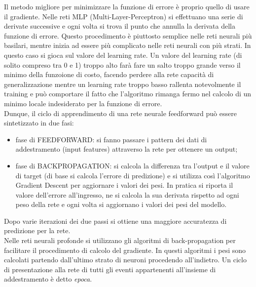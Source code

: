  Il metodo migliore per minimizzare la funzione di errore è proprio quello di usare il gradiente.
 Nelle reti MLP (Multi-Layer-Perceptron) si effettuano una serie di derivate successive e
  ogni volta si trova il punto che annulla la derivata della funzione di errore. Questo procedimento è 
  piuttosto semplice nelle reti neurali più basilari, mentre inizia ad essere più complicato
   nelle reti neurali con più strati. In questo caso si gioca sul valore del learning rate.
   Un valore del learning rate (di solito compreso tra 0 e 1) troppo alto farà fare un
    salto troppo grande verso il minimo della funzoione di costo, 
   facendo perdere alla rete capacità di generalizzazione mentre un learning rate troppo basso rallenta
    notevolmente il training e può comportare il fatto che l'algoritmo rimanga fermo nel 
    calcolo di un minimo locale indesiderato per la funzione di errore. \\
   

Dunque, il ciclo di apprendimento di una rete neurale feedforward può essere sintetizzato in due fasi:
\begin{itemize}
\item fase di FEEDFORWARD: si fanno passare i pattern dei dati di addestramento (input features) 
attraverso la rete per ottenere un output;\\
\item fase di BACKPROPAGATION: si calcola la differenza tra l'output e il valore di
  target (di base si calcola l’errore di predizione) e si utilizza così l’algoritmo Gradient Descent 
  per aggiornare i valori dei pesi. In pratica si riporta il valore dell’errore all’ingresso, 
  ne si calcola la sua derivata rispetto ad ogni peso della rete e ogni volta si aggiornano i
   valori dei pesi del modello. 
\end{itemize}
 Dopo varie iterazioni dei due passi si ottiene una maggiore accuratezza di predizione per la rete. \\ 
 Nelle reti neurali profonde si utilizzano gli algoritmi di 
 back-propagation per facilitare il procedimento di calcolo del gradiente. In questi algoritmi
  i pesi sono calcolati partendo dall’ultimo strato di neuroni procedendo all’indietro.
   Un ciclo di presentazione alla rete di tutti gli eventi appartenenti all’insieme di 
   addestramento è detto \emph{epoca}. \\
 
